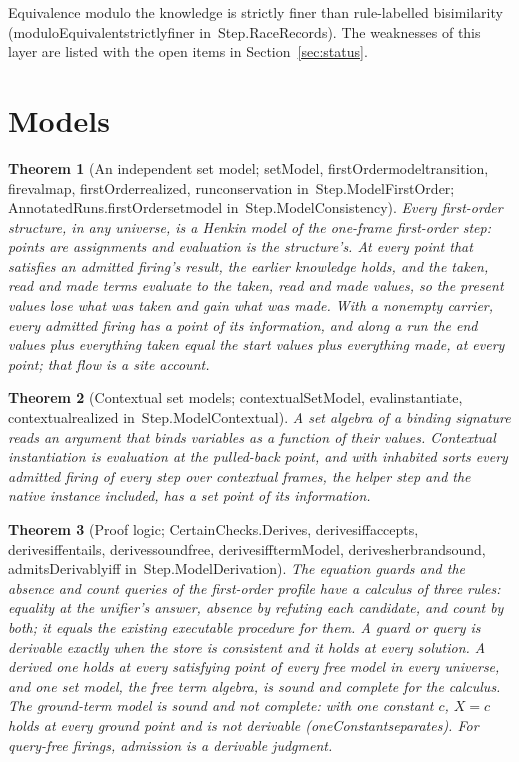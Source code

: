 \documentclass[11pt]{article}
\newtheorem{theorem}{Theorem}
\theoremstyle{remark}
\newcommand{\lean}[1]{{\ttfamily\def\_{\textunderscore\allowbreak}#1}}
\newcommand{\inmod}[1]{in~{\ttfamily\def\_{\textunderscore\allowbreak}#1}}
\begin{document}
Equivalence modulo the knowledge is strictly finer than rule-labelled bisimilarity
(\lean{moduloEquivalent\_strictly\_finer} \inmod{Step.RaceRecords}). The weaknesses of this layer are listed
with the open items in Section~\ref{sec:status}.

\section{Models}\label{sec:models}

\begin{theorem}[An independent set model; \lean{setModel}, \lean{firstOrder\_model\_transition}, \lean{fire\_val\_map}, \lean{firstOrder\_realized}, \lean{run\_conservation} \inmod{Step.ModelFirstOrder}; \lean{AnnotatedRuns.firstOrder\_set\_model} \inmod{Step.ModelConsistency}]
Every first-order structure, in any universe, is a Henkin model of the one-frame first-order step:
points are assignments and evaluation is the structure's. At every point that satisfies an admitted
firing's result, the earlier knowledge holds, and the taken, read and made terms evaluate to the
taken, read and made values, so the present values lose what was taken and gain what was made. With a
nonempty carrier, every admitted firing has a point of its information, and along a run the end values
plus everything taken equal the start values plus everything made, at every point; that flow is a site
account.
\end{theorem}

\begin{theorem}[Contextual set models; \lean{contextualSetModel}, \lean{eval\_instantiate}, \lean{contextual\_realized} \inmod{Step.ModelContextual}]
A set algebra of a binding signature reads an argument that binds variables as a function of their
values. Contextual instantiation is evaluation at the pulled-back point, and with inhabited sorts every
admitted firing of every step over contextual frames, the helper step and the native instance included,
has a set point of its information.
\end{theorem}

\begin{theorem}[Proof logic; \lean{CertainChecks.Derives}, \lean{derives\_iff\_accepts}, \lean{derives\_iff\_entails}, \lean{derives\_sound\_free}, \lean{derives\_iff\_termModel}, \lean{derives\_herbrand\_sound}, \lean{admitsDerivably\_iff} \inmod{Step.ModelDerivation}]
The equation guards and the absence and count queries of the first-order profile have a calculus of
three rules: equality at the unifier's answer, absence by refuting each candidate, and count by both;
it equals the existing executable procedure for them. A guard or query is derivable exactly when the
store is consistent and it holds at every solution. A derived one holds at every satisfying point of
every free model in every universe, and one set model, the free term algebra, is sound and complete
for the calculus. The ground-term model is sound and not complete: with one constant $c$, $X = c$ holds at every
ground point and is not derivable (\lean{oneConstant\_separates}). For
query-free firings, admission is a derivable judgment.
\end{theorem}
\end{document}
